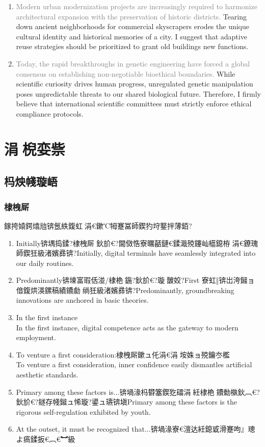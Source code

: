 ﻿\documentclass[lang=cn,11pt]{elegantbook}
\begin{document}
\begin{enumerate}
    \item \textcolor{gray}{Modern urban modernization projects are increasingly required to harmonize architectural expansion with the preservation of historic districts.} Tearing down ancient neighborhoods for commercial skyscrapers erodes the unique cultural identity and historical memories of a city. I suggest that adaptive reuse strategies should be prioritized to grant old buildings new functions.
    \item \textcolor{gray}{Today, the rapid breakthroughs in genetic engineering have forced a global consensus on establishing non-negotiable bioethical boundaries.} While scientific curiosity drives human progress, unregulated genetic manipulation poses unpredictable threats to our shared biological future. Therefore, I firmly believe that international scientific committees must strictly enforce ethical compliance protocols.
\end{enumerate}

\section{涓棿娈祡}

\subsection{杩炴帴璇峿}

\subsubsection{棣栧厛}

鎵挎媴鍔熻兘锛氬紩鍑虹涓€鏉℃牳蹇冨師鍥犳垨鐜拌薄銆?

\begin{enumerate}
\item Initially锛堣捣鍒?棣栧厛 鈥斺€?閫傚悎寮曞嚭鏈€鍒濈殑鑳屾櫙鎴栫涓€鐐瑰師鍥狅級渚嬪彞锛?Initially, digital terminals have seamlessly integrated into our daily routines.
\item Predominantly锛堜富瑕佸湴/棣栬鍦?鈥斺€?璇皵姣?First 寮虹‖锛岀洿鎺ョ偣鍑烘渶鏍稿績鐨勮绱狅級渚嬪彞锛?Predominantly, groundbreaking innovations are anchored in basic theories.
\item In the first instance\\ In the first instance, digital competence acts as the gateway to modern employment. 
\item To venture a first consideration:棣栧厛鏉ュ仛涓€涓垵姝ョ殑鑰冭檻\\To venture a first consideration, inner confidence easily dismantles artificial aesthetic standards.
\item Primary among these factors is...锛堝湪杩欎簺鍥犵礌涓紝棣栬鐨勬槸鈥︹€?鈥斺€?鐩存帴鎺ュ悕璇?鍙ュ瓙锛塡Primary among these factors is the rigorous self-regulation exhibited by youth.
\item At the outset, it must be recognized that...锛堝湪寮€澶达紝鎴戜滑蹇呴』璁よ瘑鍒扳€︹€︼級
\end{enumerate}
\end{document}
